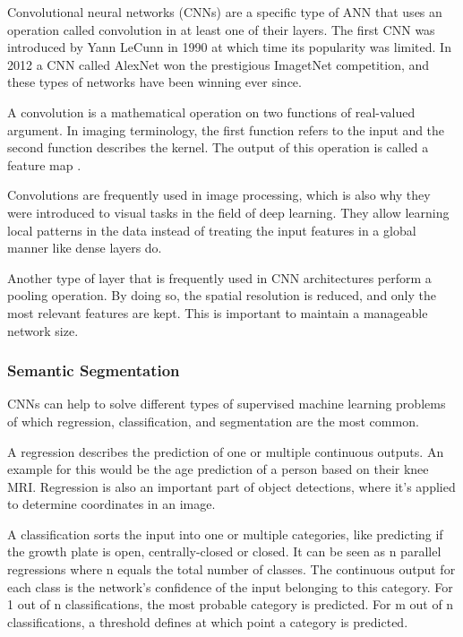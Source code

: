 Convolutional neural networks (CNNs) are a specific type of ANN that uses an operation called convolution in at least one of their layers. The first CNN was introduced by Yann LeCunn \cite{LeCun1990} in 1990 at which time its popularity was limited. In 2012 a CNN called AlexNet \cite{Krizhevsky} won the prestigious ImagetNet competition, and these types of networks have been winning ever since.

A convolution is a mathematical operation on two functions of real-valued argument. In imaging terminology, the first function refers to the input and the second function describes the kernel. The output of this operation is called a feature map \cite{Goodfellow2016}.

Convolutions are frequently used in image processing, which is also why they were introduced to visual tasks in the field of deep learning. They allow learning local patterns in the data instead of treating the input features in a global manner like dense layers do.

Another type of layer that is frequently used in CNN architectures perform a pooling operation. By doing so, the spatial resolution is reduced, and only the most relevant features are kept. This is important to maintain a manageable network size.

\subsubsection{Semantic Segmentation}

CNNs can help to solve different types of supervised machine learning problems of which regression, classification, and segmentation are the most common.

A regression describes the prediction of one or multiple continuous outputs. An example for this would be the age prediction of a person based on their knee MRI. Regression is also an important part of object detections, where it's applied to determine coordinates in an image.

A classification sorts the input into one or multiple categories, like predicting if the growth plate is open, centrally-closed or closed. It can be seen as n parallel regressions where n equals the total number of classes. The continuous output for each class is the network's confidence of the input belonging to this category. For 1 out of n classifications, the most probable category is predicted. For m out of n classifications, a threshold defines at which point a category is predicted.

